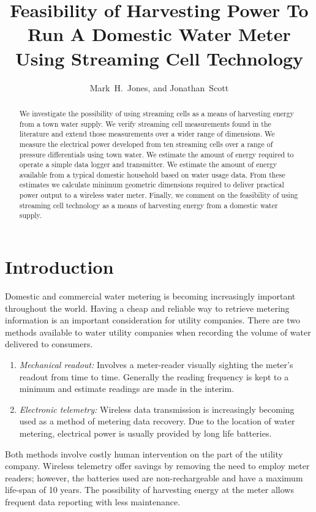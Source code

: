 \documentclass[10pt,final,journal]{IEEEtran}
\title{Feasibility of Harvesting Power To Run A Domestic Water Meter Using Streaming Cell Technology}
\author{Mark~H.~Jones, and Jonathan~Scott}
\begin{document}
    \maketitle

    \begin{abstract}
        We investigate the possibility of using streaming cells as a means of harvesting energy from a town water supply.
        We verify streaming cell measurements found in the literature and extend those measurements over a wider range of dimensions.
        We measure the electrical power developed from ten streaming cells over a range of pressure differentials using town water.
        We estimate the amount of energy required to operate a simple data logger and transmitter.
        We estimate the amount of energy available from a typical domestic household based on water usage data.
        From these estimates we calculate minimum geometric dimensions required to deliver practical power output to a wireless water meter.
        Finally, we comment on the feasibility of using streaming cell technology as a means of harvesting energy from a domestic water supply.
    \end{abstract}

    \section{Introduction}
    Domestic and commercial water metering is becoming increasingly important throughout the world.
    Having a cheap and reliable way to retrieve metering information is an important consideration for utility companies.
    There are two methods available to water utility companies when recording the volume of water delivered to consumers.
    \begin{enumerate}
        \item \emph{Mechanical readout:}
            Involves a meter-reader visually sighting the meter's readout from time to time.
            Generally the reading frequency is kept to a minimum and estimate readings are made in the interim.
        \item \emph{Electronic telemetry:}
            Wireless data transmission is increasingly becoming used as a method of metering data recovery.
            Due to the location of water metering, electrical power is usually provided by long life batteries.
        \end{enumerate}
    Both methods involve costly human intervention on the part of the utility company.
    Wireless telemetry offer savings by removing the need to employ meter readers; however, the batteries used are non-rechargeable and have a maximum life-span of 10 years.\cite{BMeters2014}
    The possibility of harvesting energy at the meter allows frequent data reporting with less maintenance.
\end{document}
